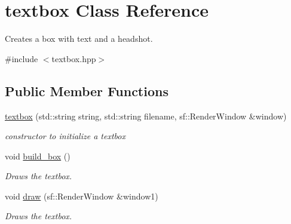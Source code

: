 \hypertarget{classtextbox}{}\section{textbox Class Reference}
\label{classtextbox}


Creates a box with text and a headshot.  




{\ttfamily \#include $<$textbox.\+hpp$>$}

\subsection*{Public Member Functions}
\begin{DoxyCompactItemize}
\item 
\hyperlink{classtextbox_afdd34f992de52674f7c9625ec6f765bf}{textbox} (std\+::string string, std\+::string filename, sf\+::\+Render\+Window \&window)
\begin{DoxyCompactList}\small\item\em constructor to initialize a textbox \end{DoxyCompactList}\item 
void \hyperlink{classtextbox_a1ef9daaf81a560bd571bc82ec09cbfda}{build\+\_\+box} ()
\begin{DoxyCompactList}\small\item\em Draws the textbox. \end{DoxyCompactList}\item 
void \hyperlink{classtextbox_a7fa168e1b9aedae0d7c9a74adea2137a}{draw} (sf\+::\+Render\+Window \&window1)
\begin{DoxyCompactList}\small\item\em Draws the textbox. \end{DoxyCompactList}\end{DoxyCompactItemize}

